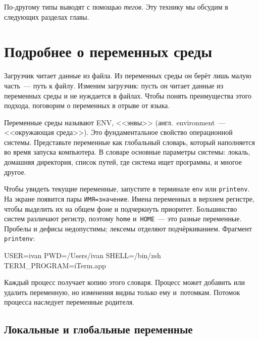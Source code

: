 
По-другому типы выводят с помощью \emph{тегов}. Эту технику мы обсудим в
следующих разделах главы.

\section{Подробнее о переменных среды}


Загрузчик читает данные из файла. Из переменных среды он берёт лишь малую
часть~--- путь к файлу. Изменим загрузчик: пусть он читает данные из переменных
среды и не нуждается в файлах. Чтобы понять преимущества этого подхода,
поговорим о переменных в отрыве от языка.

Переменные среды называют ENV, <<энвы>> (англ.~environment~--- <<окружающая
среда>>). Это фундаментальное свойство операционной системы. Представьте
переменные как глобальный словарь, который наполняется во время запуска
компьютера. В словаре основные параметры системы: локаль, домашняя директория,
список путей, где система ищет программы, и многое другое.


Чтобы увидеть текущие переменные, запустите в терминале \verb|env| или
\verb|printenv|. На экране появится пары \verb|ИМЯ=значение|. Имена переменных в
верхнем регистре, чтобы выделить их на общем фоне и подчеркнуть
приоритет. Большинство систем различают регистр, поэтому \verb|home|
и~\verb|HOME|~--- это разные переменные. Пробелы и дефисы недопустимы; лексемы
отделяют подчёркиванием. Фрагмент \verb|printenv|:

\begin{english}
  \begin{bash}
USER=ivan
PWD=/Users/ivan
SHELL=/bin/zsh
TERM_PROGRAM=iTerm.app
  \end{bash}
\end{english}

Каждый процесс получает копию этого словаря. Процесс может добавить или удалить
переменную, но изменения видны только ему и~потомкам. Потомок процесса наследует
переменные родителя.

\subsection{Локальные и глобальные переменные}



